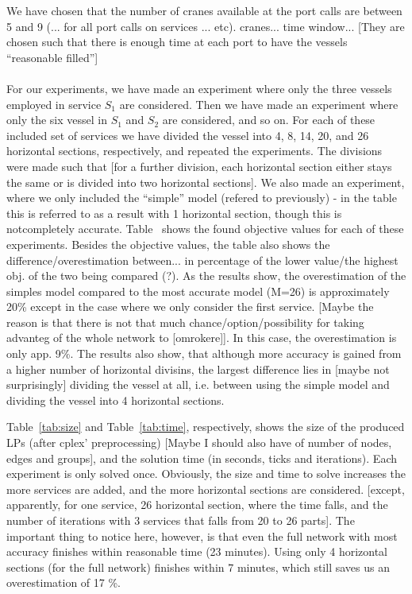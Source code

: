 We have chosen that the number of cranes available at the port calls are between 5 and 9 (... for all port calls on services ... etc). 
cranes... time window... [They are chosen such that there is enough time at each port to have the vessels ``reasonable filled'']
\\\\
For our experiments, we have made an experiment where only the three vessels employed in service $S_1$ are considered. Then we have made an experiment where only the six vessel in $S_1$ and $S_2$ are considered, and so on. For each of these included set of services we have divided the vessel into 4, 8, 14, 20, and 26 horizontal sections, respectively, and repeated the experiments. The divisions were made such that [for a further division, each horizontal section either stays the same or is divided into two horizontal sections]. We also made an experiment, where we only included the ``simple'' model (refered to previously) - in the table this is referred to as a result with 1 horizontal section, though this is notcompletely accurate. Table~ shows the found objective values for each of these experiments. Besides the objective values, the table also shows the difference/overestimation between... in percentage of the lower value/the highest obj. of the two being compared (?). As the results show, the overestimation of the simples model compared to the most accurate model (M=26) is approximately 20\% except in the case where we only consider the first service. [Maybe the reason is that there is not that much chance/option/possibility for taking advanteg of the whole network to [omrokere]]. In this case, the overestimation is only app. 9\%. The results also show, that although more accuracy is gained from a higher number of horizontal divisins, the largest difference lies in [maybe not surprisingly] dividing the vessel at all, i.e. between using the simple model and dividing the vessel into 4 horizontal sections.  

Table~\ref{tab:size} and Table~\ref{tab:time}, respectively, shows the size of the produced LPs (after cplex' preprocessing) [Maybe I should also have of number of nodes, edges and groups], and the solution time (in seconds, ticks and iterations). Each experiment is only solved once. Obviously, the size and time to solve increases the more services are added, and the more horizontal sections are considered. [except, apparently, for one service, 26 horizontal section, where the time falls, and the number of iterations with 3 services that falls from 20 to 26 parts]. The important thing to notice here, however, is that even the full network with most accuracy finishes within reasonable time (23 minutes). Using only 4 horizontal sections (for the full network) finishes within 7 minutes, which still saves us an overestimation of 17 \%.

